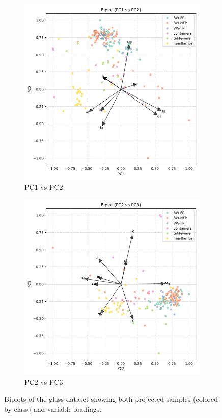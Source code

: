 \documentclass[dtu]{dtuarticle}
\begin{document}
	\begin{figure}[h!]
		\centering
		\begin{subfigure}{0.49\textwidth}
			\includegraphics[width=\linewidth]{figures/pca_biplot_pc1_pc2.pdf}
			\caption{PC1 vs PC2}
			\label{fig:biplot_pc1_pc2}
		\end{subfigure}
		\hfill
		\begin{subfigure}{0.49\textwidth}
			\includegraphics[width=\linewidth]{figures/pca_biplot_pc2_pc3.pdf}
			\caption{PC2 vs PC3}
			\label{fig:biplot_pc1_pc3}
		\end{subfigure}
		\caption{Biplots of the glass dataset showing both projected samples (colored by class) and variable loadings.}
		\label{fig:biplots}
	\end{figure}
\end{document}
